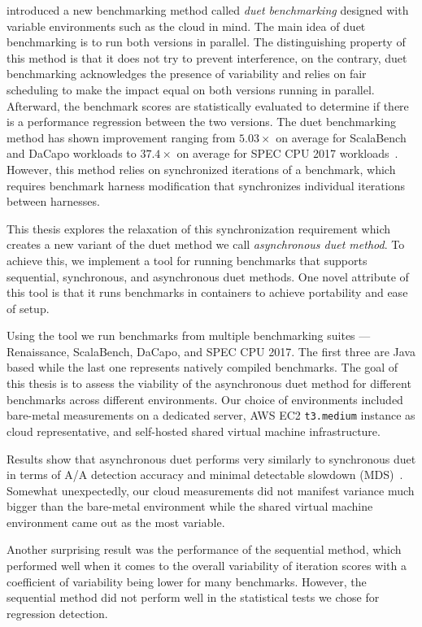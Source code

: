 \citet{bulej2020duet} introduced a new benchmarking method called \emph{duet benchmarking} designed with variable environments such as the cloud in mind.
The main idea of duet benchmarking is to run both versions in parallel.
The distinguishing property of this method is that it does not try to prevent interference, on the contrary, duet benchmarking acknowledges the presence of variability and relies on fair scheduling to make the impact equal on both versions running in parallel.
Afterward, the benchmark scores are statistically evaluated to determine if there is a performance regression between the two versions.
The duet benchmarking method has shown improvement ranging from $5.03 \times$ on average for ScalaBench and DaCapo workloads to $37.4 \times$ on average for SPEC CPU 2017 workloads~\cite{bulej2022duet}.
However, this method relies on synchronized iterations of a benchmark, which requires benchmark harness modification that synchronizes individual iterations between harnesses.

This thesis explores the relaxation of this synchronization requirement which creates a new variant of the duet method we call \emph{asynchronous duet method}.
To achieve this, we implement a tool for running benchmarks that supports sequential, synchronous, and asynchronous duet methods.
One novel attribute of this tool is that it runs benchmarks in containers to achieve portability and ease of setup.

Using the tool we run benchmarks from multiple benchmarking suites --- Renaissance, ScalaBench, DaCapo, and SPEC CPU 2017.
The first three are Java based while the last one represents natively compiled benchmarks.
The goal of this thesis is to assess the viability of the asynchronous duet method for different benchmarks across different environments.
Our choice of environments included bare-metal measurements on a dedicated server, AWS EC2 \lstinline{t3.medium} instance as cloud representative, and self-hosted shared virtual machine infrastructure.

Results show that asynchronous duet performs very similarly to synchronous duet in terms of A/A detection accuracy and minimal detectable slowdown (MDS)~\cite{laaber2019software}.
Somewhat unexpectedly, our cloud measurements did not manifest variance much bigger than the \mbox{bare-metal} environment while the shared virtual machine environment came out as the most variable.

Another surprising result was the performance of the sequential method, which performed well when it comes to the overall variability of iteration scores with a coefficient of variability being lower for many benchmarks.
However, the sequential method did not perform well in the statistical tests we chose for regression detection.

